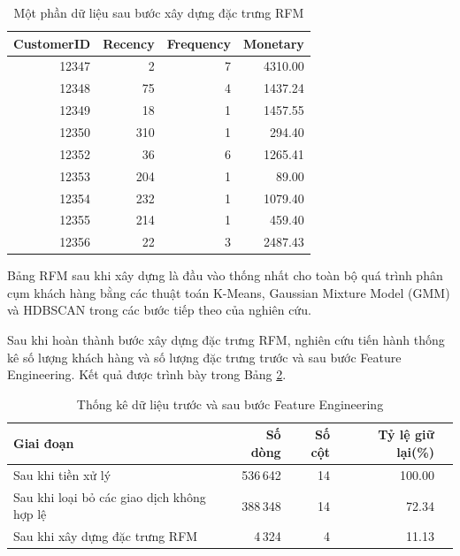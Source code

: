 \documentclass[12pt]{ai_conquer2026}
\begin{document}
\begin{table}[H]
\centering
\caption{Một phần dữ liệu sau bước xây dựng đặc trưng RFM}
\label{tab:rfm_example}
\begin{tabular}{rrrr}
\hline
\textbf{CustomerID} & \textbf{Recency} & \textbf{Frequency} & \textbf{Monetary} \\
\hline
12347 & 2   & 7 & 4310.00 \\
12348 & 75  & 4 & 1437.24 \\
12349 & 18  & 1 & 1457.55 \\
12350 & 310 & 1 & 294.40 \\
12352 & 36  & 6 & 1265.41 \\
12353 & 204 & 1 & 89.00 \\
12354 & 232 & 1 & 1079.40 \\
12355 & 214 & 1 & 459.40 \\
12356 & 22  & 3 & 2487.43 \\
\hline
\end{tabular}
\end{table}

Bảng RFM sau khi xây dựng là đầu vào thống nhất cho toàn bộ quá trình phân cụm khách hàng bằng các thuật toán K-Means, Gaussian Mixture Model (GMM) và HDBSCAN trong các bước tiếp theo của nghiên cứu.

Sau khi hoàn thành bước xây dựng đặc trưng RFM, nghiên cứu tiến hành thống kê số lượng khách hàng và số lượng đặc trưng trước và sau bước Feature Engineering. Kết quả được trình bày trong Bảng \ref{tab:data_transformation}.

\begin{table}[H]
\centering
\caption{Thống kê dữ liệu trước và sau bước Feature Engineering}
\label{tab:data_transformation}
\begin{tabular}{lrrrr}
\toprule
\textbf{Giai đoạn} & 
\textbf{Số dòng} & 
\textbf{Số cột} & 
\textbf{Tỷ lệ giữ lại(\%)} \\
\midrule

Sau khi tiền xử lý 
& 536\,642 
& 14
& 100.00 \\

Sau khi loại bỏ các giao dịch không hợp lệ
& 388\,348
& 14 
& 72.34 \\

Sau khi xây dựng đặc trưng RFM
& 4\,324
& 4  
& 11.13\\

\bottomrule
\end{tabular}
\end{table}
\end{document}
